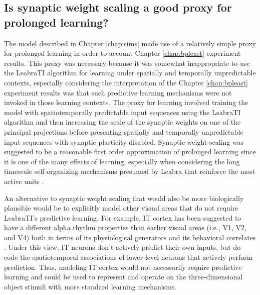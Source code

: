 \documentclass[dwyatte_dissertation.tex]{subfiles}
\begin{document}
\subsection{Is synaptic weight scaling a good proxy for prolonged learning?} 
The model described in Chapter \ref{chap:sims} made use of a relatively simple proxy for prolonged learning in order to account Chapter \ref{chap:bpleast} experiment results. This proxy was necessary because it was somewhat inappropriate to use the LeabraTI algorithm for learning under spatially and temporally unpredictable contexts, especially considering the interpretation of the Chapter \ref{chap:bpleast} experiment results was that such predictive learning mechanisms were not invoked in those learning contexts. The proxy for learning involved training the model with spatiotemporally predictable input sequences using the LeabraTI algorithm and then increasing the scale of the synaptic weights on one of the principal projections before presenting spatially and temporally unpredictable input sequences with synaptic plasticity disabled. Synaptic weight scaling was suggested to be a reasonable first order approximation of prolonged learning since it is one of the many effects of learning, especially when considering the long timescale self-organizing mechanisms presumed by Leabra that reinforce the most active units \cite{OReillyMunakata00,OReillyMunakataFrankEtAl12}.

An alternative to synaptic weight scaling that would also be more biologically plausible would be to explicitly model other visual areas that do not require LeabraTI's predictive learning. For example, IT cortex has been suggested to have a different alpha rhythm properties than earlier visual areas (i.e., V1, V2, and V4) both in terms of its physiological generators and its behavioral correlates \cite{BollimuntaChenSchroederEtAl08}. Under this view, IT neurons don't actively predict their own inputs, but do code the spatiotemporal associations \cite{CoxMeierOerteltEtAl05,LiDiCarlo08,LiDiCarlo10,LiDiCarlo12} of lower-level neurons that actively perform prediction. Thus, modeling IT cortex would not necessarily require predictive learning and could be used to represent and operate on the three-dimensional object stimuli with more standard learning mechanisms. 
\end{document}
